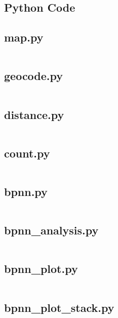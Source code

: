 \documentclass{mcmthesis}
\begin{document}
\begin{appendices}

\section{Python Code}

\subsection{map.py}\label{code:map}
\inputminted{python}{../src/map.py}

\subsection{geocode.py}\label{code:geocode}
\inputminted{python}{../src/geocode.py}

\subsection{distance.py}\label{code:distance}
\inputminted{python}{../src/distance.py}

\subsection{count.py} \label{code:count}
\inputminted{python}{../src/count.py}

\subsection{bpnn.py} \label{code:bpnn}
\inputminted{python}{../src/bpnn.py}

\subsection{bpnn\_analysis.py} \label{code:bpnn_analysis}
\inputminted{python}{../src/bpnn_analysis.py}

\subsection{bpnn\_plot.py} \label{code:bpnn_plot}
\inputminted{python}{../src/bpnn_plot.py}

\subsection{bpnn\_plot\_stack.py} \label{code:bpnn_plot_stack}
\inputminted{python}{../src/bpnn_plot_stack.py}


\end{appendices}
\end{document}
